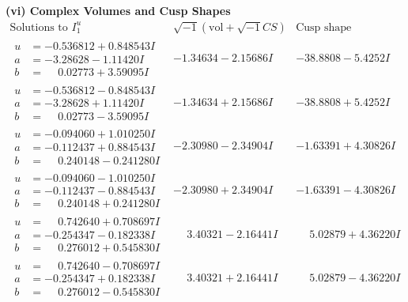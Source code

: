 \documentclass[1p]{elsarticle_modified}
\theoremstyle{definition}
\newcommand{\I}{\sqrt{-1}}
\begin{document}
\newpage\flushleft \textbf{(vi) Complex Volumes and Cusp Shapes}
$$\begin{array}{c|c|c}  
\text{Solutions to }I^u_{1}& \I (\text{vol} + \sqrt{-1}CS) & \text{Cusp shape}\\
 \hline 
\begin{aligned}
u &= -0.536812 + 0.848543 I \\
a &= -3.28628 - 1.11420 I \\
b &= \phantom{-}0.02773 + 3.59095 I\end{aligned}
 & -1.34634 - 2.15686 I & -38.8808 - 5.4252 I \\ \hline\begin{aligned}
u &= -0.536812 - 0.848543 I \\
a &= -3.28628 + 1.11420 I \\
b &= \phantom{-}0.02773 - 3.59095 I\end{aligned}
 & -1.34634 + 2.15686 I & -38.8808 + 5.4252 I \\ \hline\begin{aligned}
u &= -0.094060 + 1.010250 I \\
a &= -0.112437 + 0.884543 I \\
b &= \phantom{-}0.240148 - 0.241280 I\end{aligned}
 & -2.30980 - 2.34904 I & -1.63391 + 4.30826 I \\ \hline\begin{aligned}
u &= -0.094060 - 1.010250 I \\
a &= -0.112437 - 0.884543 I \\
b &= \phantom{-}0.240148 + 0.241280 I\end{aligned}
 & -2.30980 + 2.34904 I & -1.63391 - 4.30826 I \\ \hline\begin{aligned}
u &= \phantom{-}0.742640 + 0.708697 I \\
a &= -0.254347 - 0.182338 I \\
b &= \phantom{-}0.276012 + 0.545830 I\end{aligned}
 & \phantom{-}3.40321 - 2.16441 I & \phantom{-}5.02879 + 4.36220 I \\ \hline\begin{aligned}
u &= \phantom{-}0.742640 - 0.708697 I \\
a &= -0.254347 + 0.182338 I \\
b &= \phantom{-}0.276012 - 0.545830 I\end{aligned}
 & \phantom{-}3.40321 + 2.16441 I & \phantom{-}5.02879 - 4.36220 I \\ \hline\begin{aligned}

\end{aligned}
\end{array}$$
\end{document}
